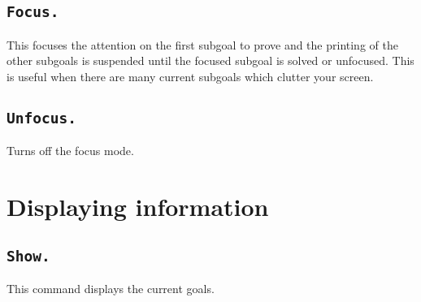 \begin{ErrMsgs}
\item {}
\end{ErrMsgs}

\subsection{\tt Focus.}
This focuses the attention on the first subgoal to prove and the printing
of the other subgoals is suspended until the focused subgoal is
solved or unfocused. This is useful when there are many current
subgoals which clutter your screen.


\subsection{\tt Unfocus.}
Turns off the focus mode.


\section{Displaying information}

\subsection{\tt Show.}\label{Show}
This command displays the current goals.

